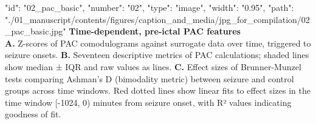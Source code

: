 {
    "id": "02_pac_basic",
    "number": "02",
    "type": "image",
    "width": "0.95\textwidth",
    "path": "./01_manuscript/contents/figures/caption_and_media/jpg_for_compilation/02_pac_basic.jpg"
}
\textbf{Time-dependent, pre-ictal PAC features}\\
\smallskip
\textbf{A.} Z-scores of PAC comodulograms against surrogate data over time, triggered to seizure onsets.
\textbf{B.} Seventeen descriptive metrics of PAC calculations; shaded lines show median ± IQR and raw values as lines.
\textbf{C.} Effect sizes of Brunner-Munzel tests comparing Ashman's D (bimodality metric) between seizure and control groups across time windows. Red dotted lines show linear fits to effect sizes in the time window [-1024, 0) minutes from seizure onset, with R² values indicating goodness of fit.
